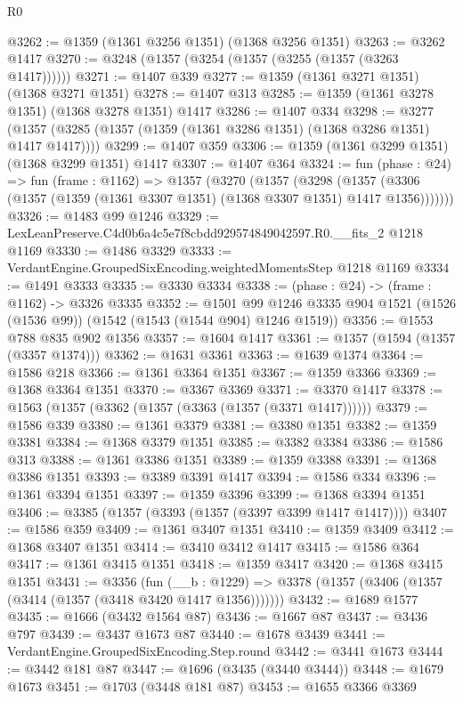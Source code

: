 \begin{lexlean}{R0}
\begin{coremodule}
@3262 := @1359 (@1361 @3256 @1351) (@1368 @3256 @1351)
@3263 := @3262 @1417
@3270 := @3248 (@1357 (@3254 (@1357 (@3255 (@1357 (@3263 @1417))))))
@3271 := @1407 @339
@3277 := @1359 (@1361 @3271 @1351) (@1368 @3271 @1351)
@3278 := @1407 @313
@3285 := @1359 (@1361 @3278 @1351) (@1368 @3278 @1351) @1417
@3286 := @1407 @334
@3298 := @3277 (@1357 (@3285 (@1357 (@1359 (@1361 @3286 @1351) (@1368 @3286 @1351) @1417 @1417))))
@3299 := @1407 @359
@3306 := @1359 (@1361 @3299 @1351) (@1368 @3299 @1351) @1417
@3307 := @1407 @364
@3324 := fun (phase : @24) =>
  fun (frame : @1162) =>
  @1357
    (@3270
      (@1357
        (@3298
          (@1357 (@3306 (@1357 (@1359 (@1361 @3307 @1351) (@1368 @3307 @1351) @1417 @1356)))))))
@3326 := @1483 @99 @1246
@3329 := LexLeanPreserve.C4d0b6a4c5e7f8cbdd929574849042597.R0.__fits_2 @1218 @1169
@3330 := @1486 @3329
@3333 := VerdantEngine.GroupedSixEncoding.weightedMomentsStep @1218 @1169
@3334 := @1491 @3333
@3335 := @3330 @3334
@3338 := (phase : @24) -> (frame : @1162) -> @3326 @3335
@3352 := @1501
    @99
    @1246
    @3335
    @904
    @1521
    (@1526 (@1536 @99))
    (@1542 (@1543 (@1544 @904) @1246 @1519))
@3356 := @1553 @788 @835 @902 @1356
@3357 := @1604 @1417
@3361 := @1357 (@1594 (@1357 (@3357 @1374)))
@3362 := @1631 @3361
@3363 := @1639 @1374
@3364 := @1586 @218
@3366 := @1361 @3364 @1351
@3367 := @1359 @3366
@3369 := @1368 @3364 @1351
@3370 := @3367 @3369
@3371 := @3370 @1417
@3378 := @1563 (@1357 (@3362 (@1357 (@3363 (@1357 (@3371 @1417))))))
@3379 := @1586 @339
@3380 := @1361 @3379
@3381 := @3380 @1351
@3382 := @1359 @3381
@3384 := @1368 @3379 @1351
@3385 := @3382 @3384
@3386 := @1586 @313
@3388 := @1361 @3386 @1351
@3389 := @1359 @3388
@3391 := @1368 @3386 @1351
@3393 := @3389 @3391 @1417
@3394 := @1586 @334
@3396 := @1361 @3394 @1351
@3397 := @1359 @3396
@3399 := @1368 @3394 @1351
@3406 := @3385 (@1357 (@3393 (@1357 (@3397 @3399 @1417 @1417))))
@3407 := @1586 @359
@3409 := @1361 @3407 @1351
@3410 := @1359 @3409
@3412 := @1368 @3407 @1351
@3414 := @3410 @3412 @1417
@3415 := @1586 @364
@3417 := @1361 @3415 @1351
@3418 := @1359 @3417
@3420 := @1368 @3415 @1351
@3431 := @3356
    (fun (__b : @1229) => @3378 (@1357 (@3406 (@1357 (@3414 (@1357 (@3418 @3420 @1417 @1356)))))))
@3432 := @1689 @1577
@3435 := @1666 (@3432 @1564 @87)
@3436 := @1667 @87
@3437 := @3436 @797
@3439 := @3437 @1673 @87
@3440 := @1678 @3439
@3441 := VerdantEngine.GroupedSixEncoding.Step.round
@3442 := @3441 @1673
@3444 := @3442 @181 @87
@3447 := @1696 (@3435 (@3440 @3444))
@3448 := @1679 @1673
@3451 := @1703 (@3448 @181 @87)
@3453 := @1655 @3366 @3369

\end{coremodule}
\end{lexlean}
